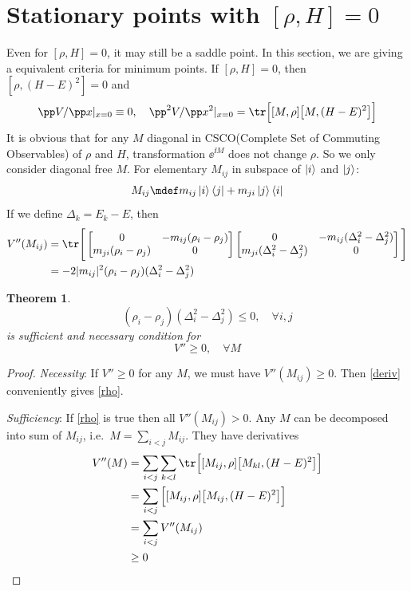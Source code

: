 \documentclass[10pt]{article}
\newtheorem{theorem}{Theorem}[section]
\begin{document}
\section{Stationary points with \texorpdfstring{$[\rho, H]=0$}{[rho, H]=0}}
Even for $[\rho, H]=0$, it may still be a saddle point. In this section, we are giving a equivalent criteria for minimum points. If $[\rho, H]=0$, then $[\rho, (H-E)^2]=0$ and
\begin{equation}
\pp V/\pp x|_{x=0}\equiv 0,\quad \pp^2 V/\pp x^2|_{x=0}=\tr \Big[[M,\rho]\big[M, (H-E)^2\big]\Big]
\end{equation}
It is obvious that for any $M$ diagonal in CSCO(Complete Set of Commuting Observables) of $\rho$ and $H$, transformation $\ee^{\ii M}$ does not change $\rho$. So we only consider diagonal free $M$. For elementary $M_{ij}$ in subspace of $\ket{i}$ and $\ket{j}$:
\[M_{ij}\mdef m_{ij}\ket i\bra j+m_{ji}\ket j\bra i\]
If we define $\Delta_k=E_k-E$, then 
\begin{align}
V''(M_{ij})&=\tr \Bigg[\begin{bmatrix}
0 &-m_{ij}(\rho_i-\rho_j)\\
m_{ji}(\rho_i-\rho_j) &0
\end{bmatrix}\begin{bmatrix}
0 &-m_{ij}(\Delta_i^2-\Delta_j^2)\\
m_{ji}(\Delta_i^2-\Delta_j^2) &0
\end{bmatrix}\Bigg]\\
&=-2|m_{ij}|^2(\rho_i-\rho_j)(\Delta_i^2-\Delta_j^2)\label{deriv}
\end{align}

\begin{theorem}
\begin{equation}
(\rho_i-\rho_j)(\Delta_i^2-\Delta_j^2)\leq0,\quad \forall i,j\label{rho}
\end{equation}
is sufficient and necessary condition for 
\begin{equation}V''\geq 0,\quad \forall M\label{allm}\end{equation}
\end{theorem}

\begin{proof}

\emph{Necessity}: If $V''\geq 0$ for any $M$, we must have $V''(M_{ij})\geq 0$. Then \ref{deriv} conveniently gives \ref{rho}.

\emph{Sufficiency}: If \ref{rho} is true then all $V''(M_{ij})>0$. Any $M$ can be decomposed into sum of $M_{ij}$, i.e.\ $M=\sum_{i<j} M_{ij}$. They have derivatives
\begin{align}
	V''(M)&=\sum_{i<j}\sum_{k<l}\tr \Big[[M_{ij},\rho]\big[M_{kl}, (H-E)^2\big]\Big]\\
	&=\sum_{i<j} \Big[[M_{ij},\rho]\big[M_{ij}, (H-E)^2\big]\Big]\\
	&=\sum_{i<j} V''(M_{ij})\\
	&\geq 0
\end{align}
\end{proof}
\end{document}
